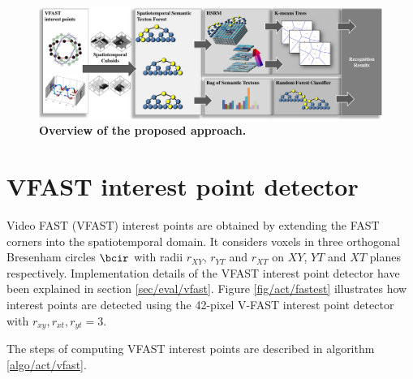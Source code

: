 \begin{figure}[ht]
	\centering  	
	\includegraphics[width=1.0\linewidth]{fig/act/fig1_new4.pdf}
	\caption{\textbf{Overview of the proposed approach.}}
	\label{fig/act/flow}
\end{figure}

\section{VFAST interest point detector}
\label{sec/act/fastest}
Video FAST (VFAST) interest points are obtained by extending the FAST corners \cite{Rosten2006} into the spatiotemporal domain. It considers voxels in three orthogonal Bresenham circles $\bcir$ with radii $r_{XY}$, $r_{YT}$ and $r_{XT}$ on $XY$, $YT$ and $XT$ planes respectively. Implementation details of the VFAST interest point detector have been explained in section \ref{sec/eval/vfast}. Figure \ref{fig/act/fastest} illustrates how interest points are detected using the 42-pixel V-FAST interest point detector with $r_{xy},r_{xt},r_{yt} = 3$. 

\iffalse
The steps of computing VFAST interest points are described in algorithm \ref{algo/act/vfast}.

